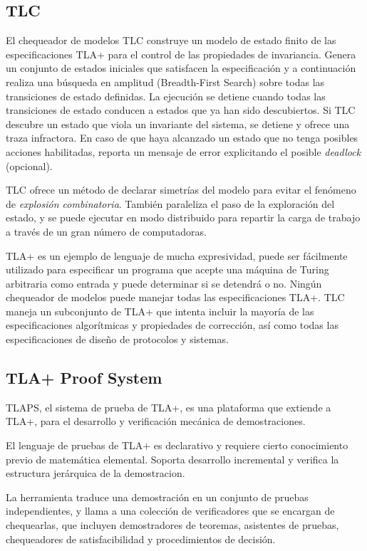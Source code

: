 \documentclass[spanish]{llncs}
\begin{document}
  \subsection{TLC}
  El chequeador de modelos TLC construye un modelo de estado finito de las especificaciones TLA+ para el control de las propiedades de invariancia.
  Genera un conjunto de estados iniciales que satisfacen la especificación y a continuación realiza una búsqueda en amplitud (Breadth-First Search) sobre todas las transiciones de estado definidas. 
  La ejecución se detiene cuando todas las transiciones de estado conducen a estados que ya han sido descubiertos. Si TLC descubre un estado que viola un invariante del sistema, se detiene y ofrece una traza infractora. En caso de que haya alcanzado un estado que no tenga posibles acciones habilitadas, 
  reporta un mensaje de error explicitando el posible \textit{deadlock} (opcional).
  
  TLC ofrece un método de declarar simetrías del modelo para evitar el fenómeno de \textit{explosión combinatoria}.
  También paraleliza el paso de la exploración del estado, y se puede ejecutar en modo distribuido para repartir la carga de trabajo a través de un gran número de computadoras.
  
  TLA+ es un ejemplo de lenguaje de mucha expresividad, puede ser fácilmente utilizado para especificar un programa que acepte una máquina de Turing arbitraria como entrada y puede determinar si se detendrá o no.
  Ningún chequeador de modelos puede manejar todas las especificaciones TLA+. TLC maneja un subconjunto de TLA+ que intenta incluir la mayoría de las especificaciones algorítmicas y propiedades de corrección, así como todas las especificaciones de diseño de protocolos y sistemas.

  \subsection{TLA+ Proof System}
  TLAPS, el sistema de prueba de TLA+, es una plataforma que extiende a TLA+, para el desarrollo y verificación mecánica de demostraciones. 
  
  El lenguaje de pruebas de TLA+ es declarativo y requiere cierto conocimiento previo de matemática elemental. Soporta desarrollo incremental y verifica la estructura jerárquica de la demostracion.
  
  La herramienta traduce una demostración en un conjunto de pruebas independientes, y llama a una colección de verificadores que se encargan de chequearlas, 
  que incluyen demostradores de teoremas, asistentes de pruebas, chequeadores de satisfacibilidad y procedimientos de decisión.
  
\end{document}
